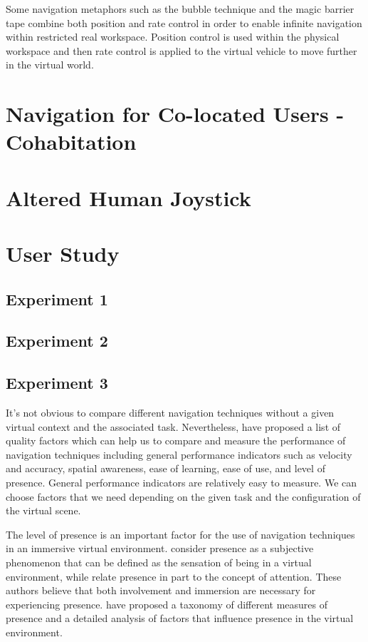 Some navigation metaphors such as the bubble technique \citep{Dominjon2005Bubble} and the magic barrier tape \citep{Cirio2009MBT} combine both position and rate control in order to enable infinite navigation within restricted real workspace. Position control is used within the physical workspace and then rate control is applied to the virtual vehicle to move further in the virtual world.

\section{Navigation for Co-located Users - Cohabitation}


\section{Altered Human Joystick}

\section{User Study}

\subsection{Experiment 1}

\subsection{Experiment 2}

\subsection{Experiment 3}

It's not obvious to compare different navigation techniques without a given virtual context and the associated task. Nevertheless, \citet{Bowman1997TIV} have proposed a list of quality factors which can help us to compare and measure the performance of navigation techniques including general performance indicators such as velocity and accuracy, spatial awareness, ease of learning, ease of use, and level of presence. General performance indicators are relatively easy to measure. We can choose factors that we need depending on the given task and the configuration of the virtual scene.

The level of presence is an important factor for the use of navigation techniques in an immersive virtual environment. \citet{Slater1994DepthPre} consider presence as a subjective phenomenon that can be defined as the sensation of being in a virtual environment, while \citet{Witmer1998MPV} relate presence in part to the concept of attention. These authors believe that both involvement and immersion are necessary for experiencing presence. \citet{Schuemie2001Pres} have proposed a taxonomy of different measures of presence and a detailed analysis of factors that influence presence in the virtual environment.

